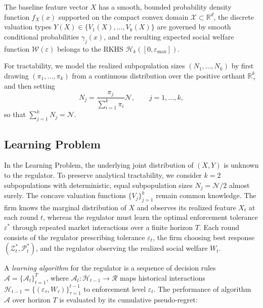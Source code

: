 \begin{assumption}
\label{ass:regularity}
The baseline feature vector $X$ has a smooth, bounded probability density function $f_X(x)$ supported on the compact convex domain $\mathcal{X} \subset \mathbb{R}^d$, the discrete valuation types $Y(X) \in \{V_1(X), \dots, V_k(X)\}$ are governed by smooth conditional probabilities $\gamma_j(x)$, and the resulting expected social welfare function $\mathcal{W}(\varepsilon)$ belongs to the RKHS $\mathcal{H}_k([0, \varepsilon_{\max}])$.
\end{assumption}

\begin{remark}
\label{rem:simplex}
For tractability, we model the realized subpopulation sizes $(N_1,\dots,N_k)$ by first drawing $(\pi_1,\dots,\pi_k)$ from a continuous distribution over the positive orthant $\mathbb{R}_+^k$ and then setting
\[
N_j = \frac{\pi_j}{\sum_{i=1}^k \pi_i}\mathcal{N},
\qquad j=1,\dots,k,
\]
so that $\sum_{j=1}^k N_j=\mathcal{N}$.
\end{remark}

\subsection{Learning Problem}

In the Learning Problem, the underlying joint distribution of $(X, Y)$ is unknown to the regulator. To preserve analytical tractability, we consider $k=2$ subpopulations with deterministic, equal subpopulation sizes $N_j = \mathcal{N}/2$ almost surely. The concave valuation functions $\{V_j\}_{j=1}^k$ remain common knowledge. The firm knows the marginal distribution of $X$ and observes its realized feature $X_t$ at each round $t$, whereas the regulator must learn the optimal enforcement tolerance $\varepsilon^*$ through repeated market interactions over a finite horizon $T$. Each round consists of the regulator prescribing tolerance $\varepsilon_t$, the firm choosing best response $(\mathcal{Z}_t^*, \mathcal{P}_t^*)$, and the regulator observing the realized social welfare $W_t$.

A \emph{learning algorithm} for the regulator is a sequence of decision rules $\mathcal{A} = \{\mathcal{A}_t\}_{t=1}^T$, where $\mathcal{A}_t : \mathcal{H}_{t-1} \to \mathcal{R}$ maps historical interactions $\mathcal{H}_{t-1} = \{(\varepsilon_\tau, W_\tau)\}_{\tau=1}^{t-1}$ to enforcement level $\varepsilon_t$. The performance of algorithm $\mathcal{A}$ over horizon $T$ is evaluated by its cumulative pseudo-regret:

